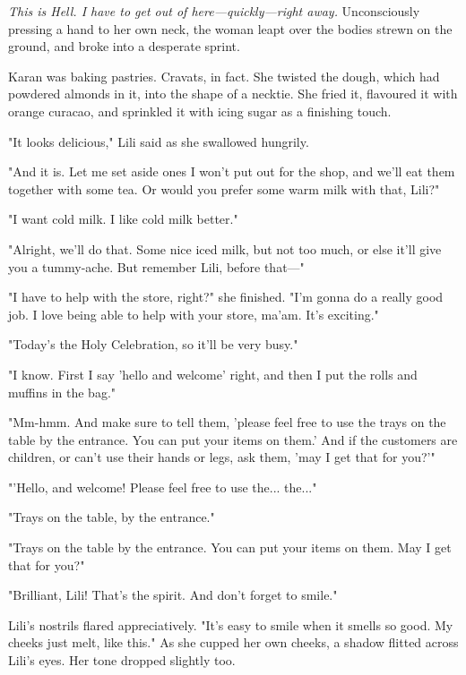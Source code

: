 \emph{This is Hell. I have to get out of here---quickly---right away.}
Unconsciously pressing a hand to her own neck, the woman leapt over the
bodies strewn on the ground, and broke into a desperate sprint.


Karan was baking pastries. Cravats, in fact. She twisted the dough,
which had powdered almonds in it, into the shape of a necktie. She fried
it, flavoured it with orange curacao, and sprinkled it with icing sugar
as a finishing touch.

"It looks delicious," Lili said as she swallowed hungrily.

"And it is. Let me set aside ones I won't put out for the shop, and
we'll eat them together with some tea. Or would you prefer some warm
milk with that, Lili?"

"I want cold milk. I like cold milk better."

"Alright, we'll do that. Some nice iced milk, but not too much, or else
it'll give you a tummy-ache. But remember Lili, before that---"

"I have to help with the store, right?" she finished. "I'm gonna do a
really good job. I love being able to help with your store, ma'am. It's
exciting."

"Today's the Holy Celebration, so it'll be very busy."

"I know. First I say 'hello and welcome' right, and then I put the rolls
and muffins in the bag."

"Mm-hmm. And make sure to tell them, 'please feel free to use the trays
on the table by the entrance. You can put your items on them.' And if
the customers are children, or can't use their hands or legs, ask them,
'may I get that for you?'"

"'Hello, and welcome! Please feel free to use the... the..."

"Trays on the table, by the entrance."

"Trays on the table by the entrance. You can put your items on them. May
I get that for you?"

"Brilliant, Lili! That's the spirit. And don't forget to smile."

Lili's nostrils flared appreciatively. "It's easy to smile when it
smells so good. My cheeks just melt, like this." As she cupped her own
cheeks, a shadow flitted across Lili's eyes. Her tone dropped slightly
too.

